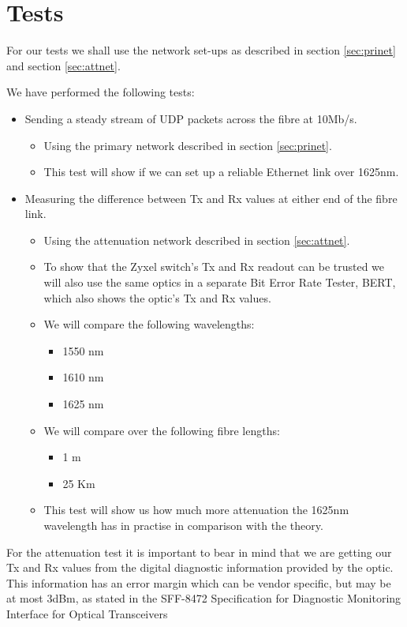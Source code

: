 \documentclass{article}
\begin{document}
\newpage
\section{Tests}
For our tests we shall use the network set-ups as described in section \ref{sec:prinet} and section \ref{sec:attnet}.

We have performed the following tests:
\begin{itemize}
\item Sending a steady stream of UDP packets across the fibre at 10Mb/s.
	\begin{itemize}
	\item Using the primary network described in section \ref{sec:prinet}.
	\item This test will show if we can set up a reliable Ethernet link over 1625nm.
	\end{itemize}
\item Measuring the difference between Tx and Rx values at either end of the fibre link.
	\begin{itemize}
	\item Using the attenuation network described in section \ref{sec:attnet}.
	\item To show that the Zyxel switch's Tx and Rx readout can be trusted we will also use the same optics in a separate Bit Error Rate Tester, BERT,  which also shows the optic's Tx and Rx values.
	\item We will compare the following wavelengths:
		\begin{itemize}
		\item 1550 nm
		\item 1610 nm
		\item 1625 nm
		\end{itemize}
	\item We will compare over the following fibre lengths:
		\begin{itemize}
		\item 1 m
		\item 25 Km
		\end{itemize}
	\item This test will show us how much more attenuation the 1625nm wavelength has in practise in comparison with the theory.
	\end{itemize}
\end{itemize}

For the attenuation test it is important to bear in mind that we are getting our Tx and Rx values from the digital diagnostic information provided by the optic.
This information has an error margin which can be vendor specific, but may be at most 3dBm, as stated in the SFF-8472 Specification for
Diagnostic Monitoring Interface for Optical Transceivers\cite{SFF:DDM}
\end{document}
